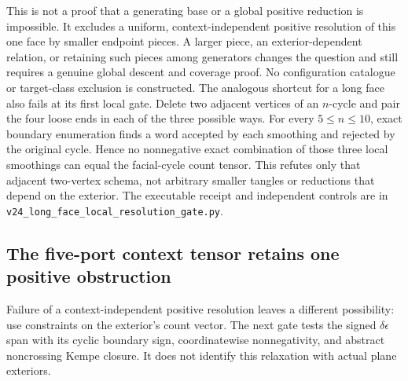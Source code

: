 This is not a proof that a generating base or a global positive reduction
is impossible. It excludes a uniform, context-independent positive
resolution of this one face by smaller endpoint pieces. A larger piece,
an exterior-dependent relation, or retaining such pieces among generators
changes the question and still requires a genuine global descent and
coverage proof. No configuration catalogue or target-class exclusion is
constructed. The analogous shortcut for a long face also fails at its first local gate.
Delete two adjacent vertices of an $n$-cycle and pair the four loose ends in
each of the three possible ways.  For every $5\leq n\leq10$, exact boundary
enumeration finds a word accepted by each smoothing and rejected by the
original cycle.  Hence no nonnegative exact combination of those three local
smoothings can equal the facial-cycle count tensor.  This refutes only that
adjacent two-vertex schema, not arbitrary smaller tangles or reductions that
depend on the exterior.  The executable receipt and independent controls are
in \texttt{v24\_long\_face\_local\_resolution\_gate.py}.

\subsection{The five-port context tensor retains one positive obstruction}
\label{sec:pentagon-context-tensor}

Failure of a context-independent positive resolution leaves a different
possibility: use constraints on the exterior's count vector. The next gate
tests the signed $\delta\epsilon$ span with its cyclic boundary sign,
coordinatewise nonnegativity, and abstract noncrossing Kempe closure.
It does not identify this relaxation with actual plane exteriors.

